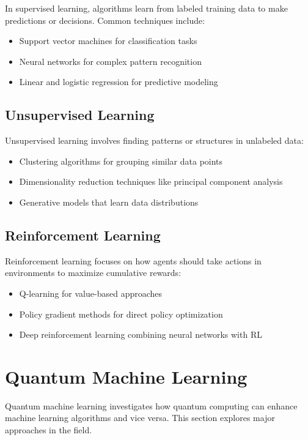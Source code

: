 \documentclass[12pt,a4paper]{article}
\begin{document}
In supervised learning, algorithms learn from labeled training data to make predictions or decisions. Common techniques include:

\begin{itemize}
    \item Support vector machines for classification tasks
    \item Neural networks for complex pattern recognition
    \item Linear and logistic regression for predictive modeling
\end{itemize}

\subsection{Unsupervised Learning}

Unsupervised learning involves finding patterns or structures in unlabeled data:

\begin{itemize}
    \item Clustering algorithms for grouping similar data points
    \item Dimensionality reduction techniques like principal component analysis
    \item Generative models that learn data distributions
\end{itemize}

\subsection{Reinforcement Learning}

Reinforcement learning focuses on how agents should take actions in environments to maximize cumulative rewards:

\begin{itemize}
    \item Q-learning for value-based approaches
    \item Policy gradient methods for direct policy optimization
    \item Deep reinforcement learning combining neural networks with RL
\end{itemize}

\section{Quantum Machine Learning}

Quantum machine learning investigates how quantum computing can enhance machine learning algorithms and vice versa. This section explores major approaches in the field.
\end{document}

